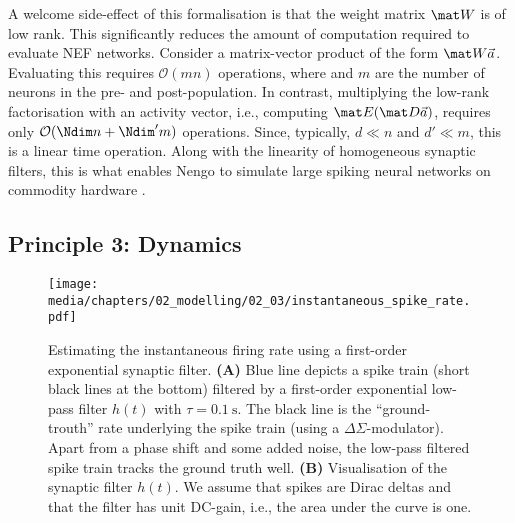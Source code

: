 
A welcome side-effect of this formalisation is that the weight matrix $\mat W$ is of low rank.
This significantly reduces the amount of computation required to evaluate NEF networks.
Consider a matrix-vector product of the form $\mat W \vec a$.
Evaluating this requires $\mathcal{O}(mn)$ operations, where \Npop and $m$ are the number of neurons in the pre- and post-population.
In contrast, multiplying the low-rank factorisation with an activity vector, i.e., computing $\mat E ( \mat D \vec a 
)$, requires only $\mathcal{O}(\Ndim n + \Ndim' m)$ operations.
Since, typically, $d \ll n$ and $d' \ll m$, this is a linear time operation.
Along with the linearity of homogeneous synaptic filters, this is what enables Nengo to simulate large spiking neural networks on commodity hardware \citep{bekolay2014nengo}.

\subsection{Principle 3: Dynamics}
\label{sec:nef_dynamics}


\begin{figure}
	\centering
	\texttt{[image: media/chapters/02\_modelling/02\_03/instantaneous\_spike\_rate.pdf]}%
	{\label{fig:instantaneous_spike_rate_a}}%
	{\label{fig:first_order_low_pass}}%
	\caption[Estimating the instantaneous firing rate using a synaptic filter]{Estimating the instantaneous firing rate using a first-order exponential synaptic filter. \textbf{(A)} Blue line depicts a spike train (short black lines at the bottom) filtered by a first-order exponential low-pass filter $h(t)$ with $\tau = \SI{0.1}{\second}$. The black line is the \enquote{ground-trouth} rate underlying the spike train (using a $\Delta\Sigma$-modulator).
	Apart from a phase shift and some added noise, the low-pass filtered spike train tracks the ground truth well.
	\textbf{(B)} Visualisation of the synaptic filter $h(t)$. We assume that spikes are Dirac deltas and that the filter has unit DC-gain, i.e., the area under the curve is one.}
	\label{fig:instantaneous_spike_rate}
\end{figure}

